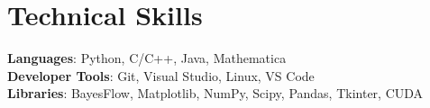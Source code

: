 \documentclass[letterpaper,11pt]{article}
\begin{document}
%
\section{Technical Skills}
 \begin{itemize}[leftmargin=0.15in, label={}]
    \small{\item{
     \textbf{Languages}{: Python, C/C++, Java, Mathematica} \\
     \textbf{Developer Tools}{: Git, Visual Studio, Linux, VS Code} \\
     \textbf{Libraries}{: BayesFlow, Matplotlib, NumPy, Scipy, Pandas, Tkinter, CUDA} \\
    }}
 \end{itemize}


\end{document}
